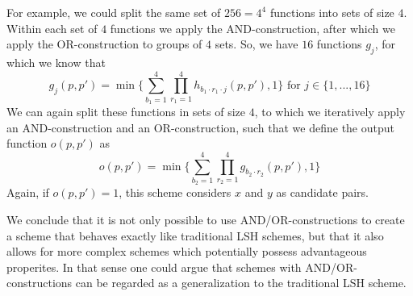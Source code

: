 For example, we could split the same set of $256 = 4^4$ functions into sets of size $4$. Within each set of $4$ functions we apply the AND-construction, after which we apply the OR-construction to groups of $4$ sets. So, we have $16$ functions $g_j$, for which we know that
\begin{equation}
    g_j(p, p') =  \min\{\sum_{b_1=1}^{4}\prod_{r_1=1}^{4}h_{b_1 \cdot r_1 \cdot j}(p,p'),1\} \text{  for } j \in \{1,...,16\}
\end{equation}
 We can again split these functions in sets of size $4$, to which we iteratively apply an AND-construction and an OR-construction, such that we define the output function $o(p,p')$ as 
\begin{equation}
    o(p,p') = \min\{\sum_{b_2=1}^{4}\prod_{r_2=1}^{4}g_{b_2 \cdot r_2}(p,p'),1\}
\end{equation} 
Again, if $o(p,p') = 1$, this scheme considers $x$ and $y$ as candidate pairs.

We conclude that it is not only possible to use AND/OR-constructions to create a scheme that behaves exactly like traditional LSH schemes, but that it also allows for more complex schemes which potentially possess advantageous properites. In that sense one could argue that schemes with AND/OR-constructions can be regarded as a generalization to the traditional LSH scheme.